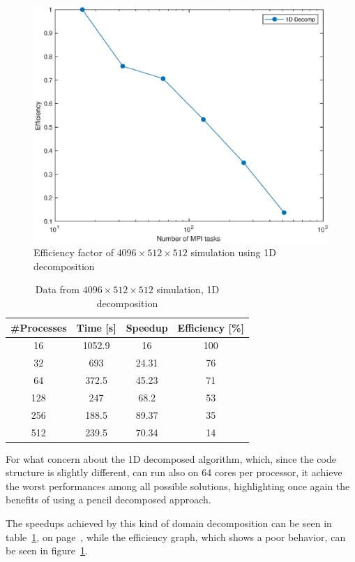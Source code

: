 \begin{figure}
\begin{center}
\includegraphics[scale=0.55]{grafici/20483}
\caption{Efficiency factor of $4096\times512 \times512$ simulation using 1D decomposition}
\label{20483}
\end{center}
\end{figure}

\begin{table}
\caption{Data from $4096\times 512\times 512$ simulation, 1D decomposition}
\begin{center}
\begin{tabular}{c c c c}
\toprule
\textbf{\#Processes} & \textbf{Time [s]} & \textbf{Speedup} & \textbf{Efficiency [\%]}\\
\midrule
16 & 1052.9 & 16 & 100\\
32 & 693 & 24.31 & 76\\
64 & 372.5 & 45.23 & 71\\
128 & 247 & 68.2 & 53\\
256 & 188.5 & 89.37 & 35\\
512 & 239.5 & 70.34 & 14\\
\bottomrule
\end{tabular}
\end{center}
\label{2048:data:1}
\end{table}

\par
For what concern about the 1D decomposed algorithm, which, since the code structure is slightly different, can run also on 64 cores per processor, it achieve the worst performances among all possible solutions, highlighting once again the benefits of using a pencil decomposed approach. \par
The speedups achieved by this kind of domain decomposition can be seen in table~\ref{2048:data:1}, on page~\pageref{2048:data:1}, while the efficiency graph, which shows a poor behavior, can be seen in figure~\ref{20483}. \\
\par



